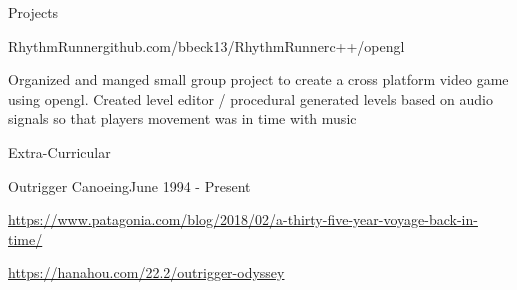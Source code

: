 \documentclass{resume} %
\begin{document}
\begin{rSection}{Projects} \itemsep -2pt
\begin{rSubsection}{RhythmRunner}{github.com/bbeck13/RhythmRunner}{c++/opengl}{}
\item Organized and manged small group project to create a cross platform video game using opengl. Created level editor / procedural generated levels based on audio signals so that players movement was in time with music

\end{rSubsection}

\end{rSection}

\begin{rSection}{Extra-Curricular}
\begin{rSubsection} {Outrigger Canoeing}{June 1994 - Present}{}{}
\item \href{https://www.patagonia.com/blog/2018/02/a-thirty-five-year-voyage-back-in-time/}{https://www.patagonia.com/blog/2018/02/a-thirty-five-year-voyage-back-in-time/}
\item \href{https://hanahou.com/22.2/outrigger-odyssey}{https://hanahou.com/22.2/outrigger-odyssey}
\end{rSubsection}
\end{rSection}
\end{document}
